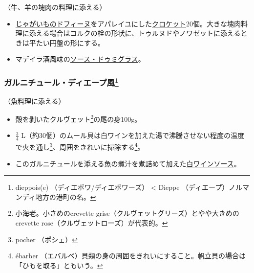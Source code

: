 \begin{recette}

（牛、羊の塊肉の料理に添える）

\begin{itemize}
\item
  \protect\hyperlink{pomme-de-terres-dauphine}{じゃがいものドフィーヌ}をアパレイユにした\protect\hyperlink{croquettes}{クロケット}20個。大きな塊肉料理に添える場合はコルクの栓の形状に、トゥルヌドやノワゼットに添えるときは平たい円盤の形にする。
\item
  マデイラ酒風味の\protect\hyperlink{sauce-demi-glace}{ソース・ドゥミグラス}。
\end{itemize}

\hypertarget{garniture-a-la-dieppoise}{%
\subsubsection[ガルニチュール・ディエープ風]{\texorpdfstring{ガルニチュール・ディエープ風\footnote{dieppois(e)
  （ディエポワ/ディエポワーズ） \textless{} Dieppe
  （ディエープ）ノルマンディ地方の港町の名。}}{ガルニチュール・ディエープ風}}\label{garniture-a-la-dieppoise}}



（魚料理に添える）

\begin{itemize}
\item
  殻を剥いたクルヴェット\footnote{小海老。小さめのcrevette
    grise（クルヴェットグリーズ）とやや大きめのcrevette
    rose（クルヴェットローズ）が代表的。}の尾の身100g。
\item
  \(\frac{3}{4}\)
  L（約30個）のムール貝は白ワインを加えた湯で沸騰させない程度の温度で火を通し\footnote{pocher
    （ポシェ）}、周囲をきれいに掃除する\footnote{ébarber
    （エバルベ）貝類の身の周囲をきれいにすること。帆立貝の場合は「ひもを取る」ともいう。}。
\item
  このガルニチュールを添える魚の煮汁を煮詰めて加えた\protect\hyperlink{sauce-vin-blanc}{白ワインソース}。
\end{itemize}


\end{recette}
